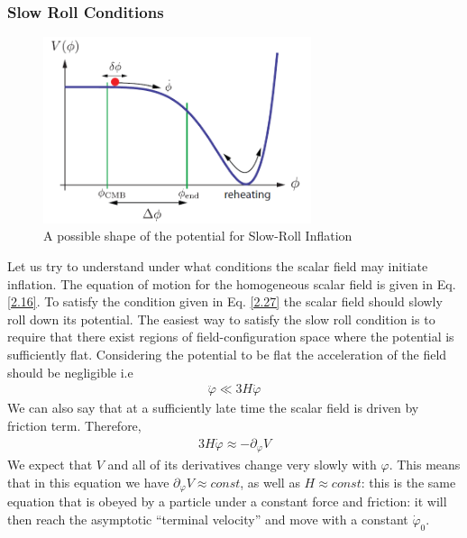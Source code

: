\subsubsection{Slow Roll Conditions}
\begin{figure}[h]
    \centering
    \includegraphics[width=0.7\textwidth]{inflaton.png}
    \caption{A possible shape of the potential for Slow-Roll Inflation \cite{baumann2012tasi}}
    \label{fig:2.2} 
\end{figure}
\hspace{0.5cm} Let us try to understand under what conditions the scalar field may initiate inflation. The equation of motion for the homogeneous scalar field is given in Eq. \ref{2.16}. To satisfy the condition given in Eq. \ref{2.27} the scalar field should slowly roll down its potential. The easiest way to satisfy the slow roll condition is to require that there exist regions of field-configuration space where the potential is sufficiently flat. Considering the potential to be flat the acceleration of the field should be negligible i.e
\begin{align}
    \ddot{\varphi} \ll 3H\dot{\varphi} \label{2.29}
\end{align}
We can also say that at a sufficiently late time the scalar field is driven by friction term. Therefore,
\begin{align}
    3H\dot{\varphi} \approx -\partial_{\varphi} V \label{2.30}
\end{align}
We expect that $V$ and all of its derivatives change very slowly with $\varphi$.
This means that in this equation we have \(\partial_{\varphi} V \approx const\), as well as \(H \approx const\): this is the same equation that is obeyed by a particle under a constant force and friction: it will then reach the asymptotic ``{terminal velocity}'' and move with a constant \(\dot{\varphi}_0 \).\\ 


